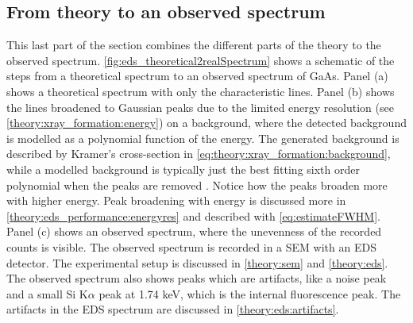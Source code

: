 \subsection{From theory to an observed spectrum}
\label{theory:eds:fromtheorytoreal}

This last part of the section combines the different parts of the theory to the observed spectrum.
\cref{fig:eds_theoretical2realSpectrum} shows a schematic of the steps from a theoretical spectrum to an observed spectrum of GaAs.
Panel (a) shows a theoretical spectrum with only the characteristic lines.
Panel (b) shows the lines broadened to Gaussian peaks due to the limited energy resolution (see \cref{theory:xray_formation:energy}) on a background, where the detected background is modelled as a polynomial function of the energy.
The generated background is described by Kramer's cross-section in \cref{eq:theory:xray_formation:background}, while a modelled background is typically just the best fitting sixth order polynomial when the peaks are removed \cite{hyperspy_1.7.1}.
Notice how the peaks broaden more with higher energy.
Peak broadening with energy is discussed more in \cref{theory:eds_performance:energyres} and described with \cref{eq:estimateFWHM}.
Panel (c) shows an observed spectrum, where the unevenness of the recorded counts is visible.
The observed spectrum is recorded in a SEM with an EDS detector.
The experimental setup is discussed in \cref{theory:sem} and \cref{theory:eds}.
The observed spectrum also shows peaks which are artifacts, like a noise peak and a small Si K$\alpha$ peak at 1.74 keV, which is the internal fluorescence peak.
The artifacts in the EDS spectrum are discussed in \cref{theory:eds:artifacts}.


